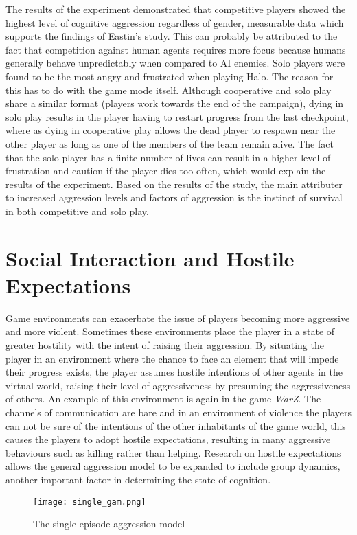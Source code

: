 \documentclass[12pt]{report}
\begin{document}
The results of the experiment demonstrated that competitive players showed the highest level of cognitive aggression regardless of gender, measurable data which supports the findings of Eastin's study. This can probably be attributed to the fact that competition against human agents requires more focus because humans generally behave unpredictably when compared to AI enemies. Solo players were found to be the most angry and frustrated when playing Halo. The reason for this has to do with the game mode itself. Although cooperative and solo play share a similar format (players work towards the end of the campaign), dying in solo play results in the player having to restart progress from the last checkpoint, where as dying in cooperative play allows the dead player to respawn near the other player as long as one of the members of the team remain alive. The fact that the solo player has a finite number of lives can result in a higher level of frustration and caution if the player dies too often, which would explain the results of the experiment. Based on the results of the study, the main attributer to increased aggression levels and factors of aggression is the instinct of survival in both competitive and solo play.

\section{Social Interaction and Hostile Expectations}
Game environments can exacerbate the issue of players becoming more aggressive and more violent. Sometimes these environments place the player in a state of greater hostility with the intent of raising their aggression.\cite{Hostile_expectations} By situating the player in an environment where the chance to face an element that will impede their progress exists, the player assumes hostile intentions of other agents in the virtual world, raising their level of aggressiveness by presuming the aggressiveness of others. An example of this environment is again in the game \textit{WarZ}. The channels of communication are bare and in an environment of violence the players can not be sure of the intentions of the other inhabitants of the game world, this causes the players to adopt hostile expectations, resulting in many aggressive behaviours such as killing rather than helping. Research on hostile expectations allows the general aggression model to be expanded to include group dynamics, another important factor in determining the state of cognition.

\begin{figure}[h]
\begin{center}
\leavevmode
\texttt{[image: single\_gam.png]}
\end{center}
\caption{The single episode aggression model \cite{Hostile_expectations}}
\label{fig:single_eps_aggression_model}
\end{figure}
\end{document}
